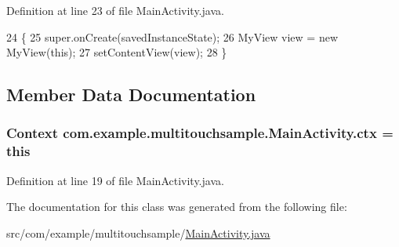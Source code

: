 Definition at line 23 of file Main\+Activity.\+java.


\begin{DoxyCode}
24     \{
25         super.onCreate(savedInstanceState);
26         MyView view = \textcolor{keyword}{new} MyView(\textcolor{keyword}{this});
27         setContentView(view);
28     \}
\end{DoxyCode}


\subsection{Member Data Documentation}
\hypertarget{classcom_1_1example_1_1multitouchsample_1_1_main_activity_a55ac0e8368b828f2e73446810af25a24}{}
\subsubsection[{ctx}]{\setlength{\rightskip}{0pt plus 5cm}Context com.\+example.\+multitouchsample.\+Main\+Activity.\+ctx = this\hspace{0.3cm}{\ttfamily [private]}}\label{classcom_1_1example_1_1multitouchsample_1_1_main_activity_a55ac0e8368b828f2e73446810af25a24}


Definition at line 19 of file Main\+Activity.\+java.



The documentation for this class was generated from the following file\+:\begin{DoxyCompactItemize}
\item 
src/com/example/multitouchsample/\hyperlink{_main_activity_8java}{Main\+Activity.\+java}\end{DoxyCompactItemize}
